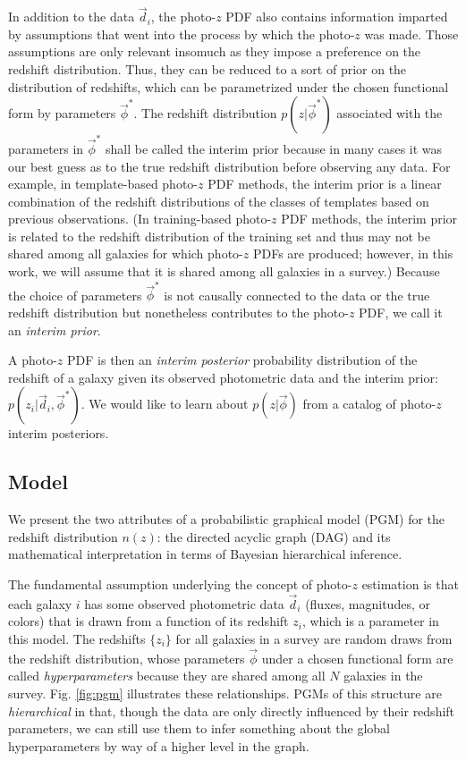 \documentclass[iop]{emulateapj}
\begin{document}
In addition to the data $\vec{d}_{i}$, the photo-$z$ PDF also contains information imparted by assumptions that went into the process by which the photo-$z$ was made.  Those assumptions are only relevant insomuch as they impose a preference on the redshift distribution. Thus, they can be reduced to a sort of prior on the distribution of redshifts, which can be parametrized under the chosen functional form by parameters $\vec{\phi}^{*}$.  The redshift distribution $p(z | \vec{\phi}^{*})$ associated with the parameters in $\vec{\phi}^{*}$ shall be called the interim prior because in many cases it was our best guess as to the true redshift distribution before observing any data.  For example, in template-based photo-$z$ PDF methods, the interim prior is a linear combination of the redshift distributions of the classes of templates based on previous observations.  (In training-based photo-$z$ PDF methods, the interim prior is related to the redshift distribution of the training set and thus may not be shared among all galaxies for which photo-$z$ PDFs are produced; however, in this work, we will assume that it is shared among all galaxies in a survey.)  Because the choice of parameters $\vec{\phi}^{*}$ is not causally connected to the data or the true redshift distribution but nonetheless contributes to the photo-$z$ PDF, we call it an \textit{interim prior}.  

A photo-$z$ PDF is then an \textit{interim posterior} probability distribution of the redshift of a galaxy given its observed photometric data and the interim prior: $p(z_{i} | \vec{d}_{i}, \vec{\phi}^{*})$.  We would like to learn about $p(z | \vec{\phi})$ from a catalog of photo-$z$ interim posteriors.

\subsection{Model}
\label{sec:model}

We present the two attributes of a probabilistic graphical model (PGM) for the redshift distribution $n(z)$: the directed acyclic graph (DAG) and its mathematical interpretation in terms of Bayesian hierarchical inference.  

The fundamental assumption underlying the concept of photo-$z$ estimation is that each galaxy $i$ has some observed photometric data $\vec{d}_{i}$ (fluxes, magnitudes, or colors) that is drawn from a function of its redshift $z_{i}$, which is a parameter in this model.  The redshifts $\{z_{i}\}$ for all galaxies in a survey are random draws from the redshift distribution, whose parameters  $\vec{\phi}$ under a chosen functional form are called \textit{hyperparameters} because they are shared among all $N$ galaxies in the survey.  Fig. \ref{fig:pgm} illustrates these relationships.  PGMs of this structure are \textit{hierarchical} in that, though the data are only directly influenced by their redshift parameters, we can still use them to infer something about the global hyperparameters by way of a higher level in the graph.
\end{document}
